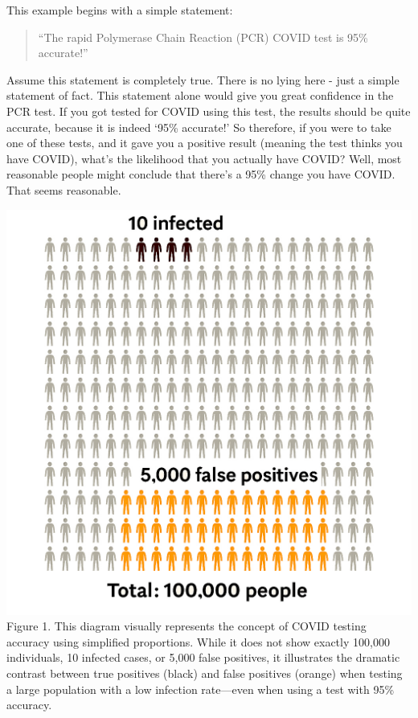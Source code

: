 \documentclass[10pt]{article}
\newenvironment{Figure}
  {\par\medskip\noindent\minipage{\linewidth}}
  {\endminipage\par\medskip}
\begin{document}
\begin{multicols}{2}
This example begins with a simple statement:
\begin{quotation}
``The rapid Polymerase Chain Reaction (PCR) COVID test is 95\% accurate!''
\end{quotation}
Assume this statement is completely true. There is no lying here - just a simple statement of fact. This statement alone would give you great confidence in the PCR test. If you got tested for COVID using this test, the results should be quite accurate, because it is indeed `95\% accurate!' So therefore, if you were to take one of these tests, and it gave you a positive result (meaning the test thinks you have COVID), what's the likelihood that you actually have COVID? Well, most reasonable people might conclude that there's a 95\% change you have COVID. That seems reasonable.

\begin{Figure}
\centering
\includegraphics[width=\textwidth]{infection_diagram.jpg}
{\footnotesize Figure 1. This diagram visually represents the concept of COVID testing accuracy using simplified proportions. While it does not show exactly 100,000 individuals, 10 infected cases, or 5,000 false positives, it illustrates the dramatic contrast between true positives (black) and false positives (orange) when testing a large population with a low infection rate—even when using a test with 95\% accuracy.}
\end{Figure}


\end{multicols}
\end{document}

